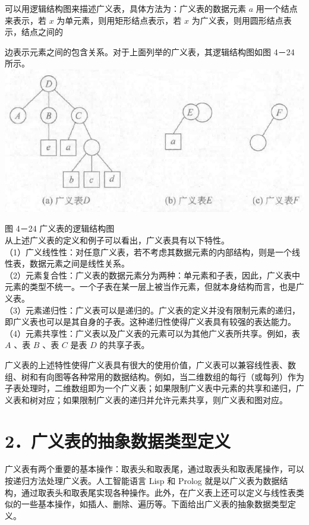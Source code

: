 \documentclass[10pt]{article}
\begin{document}
可以用逻辑结构图来描述广义表，具体方法为：广义表的数据元素 $a$ 用一个结点来表示，若 $x$ 为单元素，则用矩形结点表示，若 $x$ 为广义表，则用圆形结点表示，结点之间的

边表示元素之间的包含关系。对于上面列举的广义表，其逻辑结构图如图 4－24 所示。\\
\includegraphics[max width=\textwidth, center]{2025_06_06_704745ea57b15b2333e5g-130}

图 4－24 广义表的逻辑结构图\\
从上述广义表的定义和例子可以看出，广义表具有以下特性。\\
（1）广义线性性：对任意广义表，若不考虑其数据元素的内部结构，则是一个线性表，数据元素之间是线性关系。\\
（2）元素复合性：广义表的数据元素分为两种：单元素和子表，因此，广义表中元素的类型不统一。一个子表在某一层上被当作元素，但就本身结构而言，也是广义表。\\
（3）元素递归性：广义表可以是递归的。广义表的定义并没有限制元素的递归，即广义表也可以是其自身的子表。这种递归性使得广义表具有较强的表达能力。\\
（4）元素共享性：广义表以及广义表的元素可以为其他广义表所共享。例如，表 $A$ 、表 $B$ 、表 $C$ 是表 $D$ 的共享子表。

广义表的上述特性使得广义表具有很大的使用价值，广义表可以兼容线性表、数组、树和有向图等各种常用的数据结构。例如，当二维数组的每行（或每列）作为子表处理时，二维数组即为一个广义表；如果限制广义表中元素的共享和递归，广义表和树对应；如果限制广义表的递归并允许元素共享，则广义表和图对应。

\section*{2．广义表的抽象数据类型定义}
广义表有两个重要的基本操作：取表头和取表尾，通过取表头和取表尾操作，可以按递归方法处理广义表。人工智能语言 Lisp 和 Prolog 就是以广义表为数据结构，通过取表头和取表尾实现各种操作。此外，在广义表上还可以定义与线性表类似的一些基本操作，如插人、删除、遍历等。下面给出广义表的抽象数据类型定义。
\end{document}
